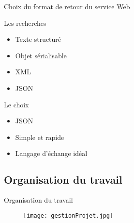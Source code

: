 
\begin{frame}{Choix du format de retour du service Web}
	\begin{block}{Les recherches}
		\begin{itemize}
			\item Texte structur\'e
			\item Objet s\'erialisable
			\item XML
			\item JSON
		
		\end{itemize}

	\end{block}
	
	\begin{block}{Le choix}
		\begin{itemize}
			\item JSON
			\item Simple et rapide
			\item Langage d'\'echange id\'eal
		
		\end{itemize}

	\end{block}

\end{frame}


\subsection{Organisation du travail}

\begin{frame}{Organisation du travail}
	\begin{figure}[h]
		\centering
		\texttt{[image: gestionProjet.jpg]}

	\end{figure}

\end{frame}














